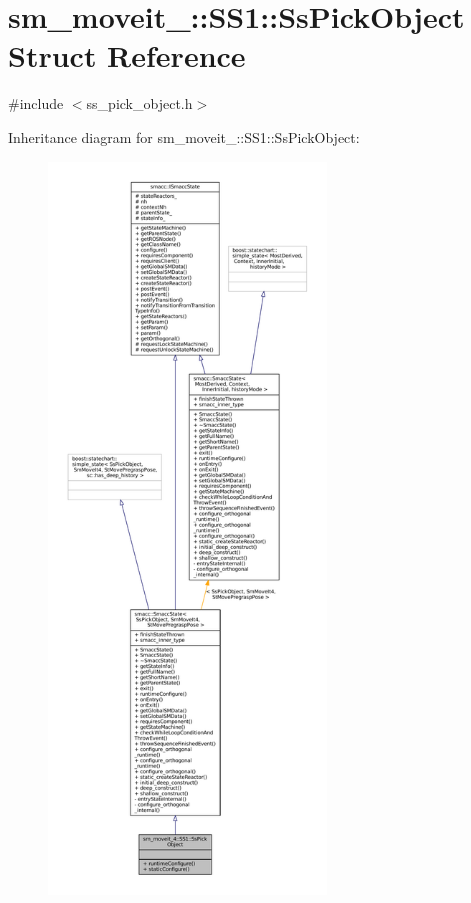 \hypertarget{structsm__moveit__4_1_1SS1_1_1SsPickObject}{}\section{sm\+\_\+moveit\+\_\+:\+:S\+S1\+:\+:Ss\+Pick\+Object Struct Reference}
\label{structsm__moveit__4_1_1SS1_1_1SsPickObject}


{\ttfamily \#include $<$ss\+\_\+pick\+\_\+object.\+h$>$}



Inheritance diagram for sm\+\_\+moveit\+\_\+:\+:S\+S1\+:\+:Ss\+Pick\+Object\+:
\nopagebreak
\begin{figure}[H]
\begin{center}
\leavevmode
\includegraphics[height=550pt]{structsm__moveit__4_1_1SS1_1_1SsPickObject__inherit__graph}
\end{center}
\end{figure}


